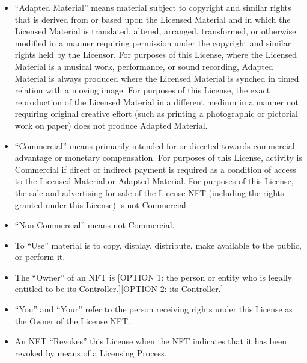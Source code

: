 \documentclass{article}
\newcommand{\subsect}[1]{\vspace{12pt}\noindent{\em{#1}}}
\begin{document}
\begin{sffamily}
\begin{itemize}
	\item ``Adapted Material'' means material subject to copyright and similar rights that is derived from or based upon the Licensed Material and in which the Licensed Material is translated, altered, arranged, transformed, or otherwise modified in a manner requiring permission under the copyright and similar rights held by the Licensor. For purposes of this License, where the Licensed Material is a musical work, performance, or sound recording, Adapted Material is always produced where the Licensed Material is synched in timed relation with a moving image. For purposes of this License, the exact reproduction of the Licensed Material in a different medium in a manner not requiring original creative effort (such as printing a photographic or pictorial work on paper) does not produce Adapted Material.

	\item	``Commercial'' means primarily intended for or directed towards commercial advantage or monetary compensation. For purposes of this License, activity is Commercial if direct or indirect payment is required as a condition of access to the Licensed Material or Adapted Material. For purposes of this License, the sale and advertising for sale of the License NFT (including the rights granted under this License) is not Commercial.

	\item	``Non-Commercial'' means not Commercial.

	\item	To ``Use'' material is to copy, display, distribute, make available to the public, or perform it.

	\end{itemize}

	\subsect{Ownership and Transfers}

	\begin{itemize}
	
	\item	 The ``Owner'' of an NFT is [OPTION 1: the person or entity who is legally entitled to be its Controller.][OPTION 2: its Controller.]
		
	\item	``You'' and ``Your'' refer to the person receiving rights under this License as the Owner of the License NFT.

	\item	An NFT ``Revokes'' this License when the NFT indicates that it has been revoked by means of a Licensing Process.


\end{itemize}
\end{sffamily}
\end{document}
